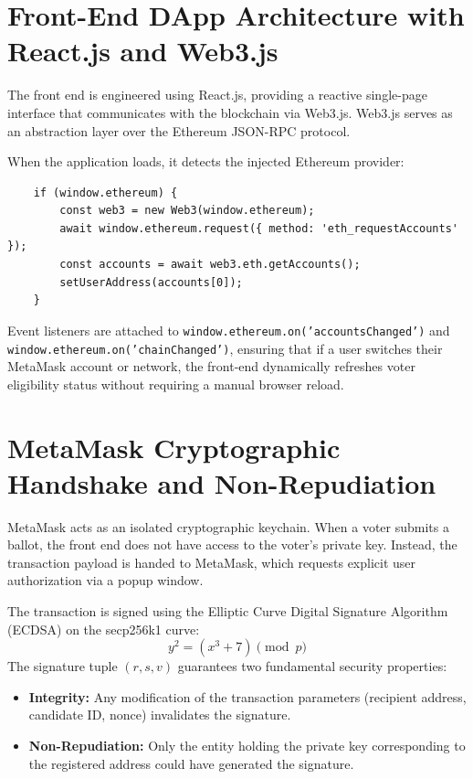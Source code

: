 \documentclass[12pt,a4paper]{report}
\begin{document}
\section{Front-End DApp Architecture with React.js and Web3.js}
The front end is engineered using React.js, providing a reactive single-page interface that communicates with the blockchain via Web3.js. Web3.js serves as an abstraction layer over the Ethereum JSON-RPC protocol.

When the application loads, it detects the injected Ethereum provider:
\begin{verbatim}
    if (window.ethereum) {
        const web3 = new Web3(window.ethereum);
        await window.ethereum.request({ method: 'eth_requestAccounts' });
        const accounts = await web3.eth.getAccounts();
        setUserAddress(accounts[0]);
    }
\end{verbatim}
Event listeners are attached to \texttt{window.ethereum.on('accountsChanged')} and \texttt{window.ethereum.on('chainChanged')}, ensuring that if a user switches their MetaMask account or network, the front-end dynamically refreshes voter eligibility status without requiring a manual browser reload.

\section{MetaMask Cryptographic Handshake and Non-Repudiation}
MetaMask acts as an isolated cryptographic keychain. When a voter submits a ballot, the front end does not have access to the voter's private key. Instead, the transaction payload is handed to MetaMask, which requests explicit user authorization via a popup window.

The transaction is signed using the Elliptic Curve Digital Signature Algorithm (ECDSA) on the secp256k1 curve:
\begin{equation}
    y^2 = (x^3 + 7) \pmod p
\end{equation}
The signature tuple $(r, s, v)$ guarantees two fundamental security properties:
\begin{itemize}
    \item \textbf{Integrity:} Any modification of the transaction parameters (recipient address, candidate ID, nonce) invalidates the signature.
    \item \textbf{Non-Repudiation:} Only the entity holding the private key corresponding to the registered address could have generated the signature.
\end{itemize}
\end{document}
